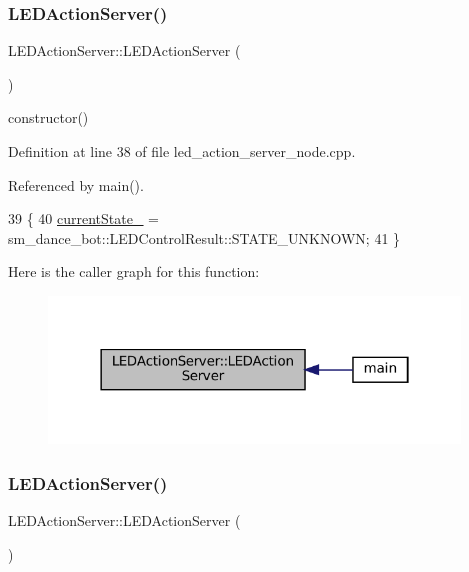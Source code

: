 \subsubsection{\texorpdfstring{L\+E\+D\+Action\+Server()}{LEDActionServer()}\hspace{0.1cm}{\footnotesize\ttfamily [1/5]}}
{\footnotesize\ttfamily L\+E\+D\+Action\+Server\+::\+L\+E\+D\+Action\+Server (\begin{DoxyParamCaption}{ }\end{DoxyParamCaption})\hspace{0.3cm}{\ttfamily [inline]}}

constructor() 

Definition at line 38 of file led\+\_\+action\+\_\+server\+\_\+node.\+cpp.



Referenced by main().


\begin{DoxyCode}
39   \{
40     \hyperlink{classLEDActionServer_a1dc456e987dc331501ad6ff2215661ff}{currentState\_} =  sm\_dance\_bot::LEDControlResult::STATE\_UNKNOWN;
41   \}
\end{DoxyCode}
Here is the caller graph for this function\+:
\nopagebreak
\begin{figure}[H]
\begin{center}
\leavevmode
\includegraphics[width=310pt]{classLEDActionServer_a6978c43940438b9fd8bfcd6b443092d3_icgraph}
\end{center}
\end{figure}
\mbox{\label{classLEDActionServer_a6978c43940438b9fd8bfcd6b443092d3}} 
\subsubsection{\texorpdfstring{L\+E\+D\+Action\+Server()}{LEDActionServer()}\hspace{0.1cm}{\footnotesize\ttfamily [2/5]}}
{\footnotesize\ttfamily L\+E\+D\+Action\+Server\+::\+L\+E\+D\+Action\+Server (\begin{DoxyParamCaption}{ }\end{DoxyParamCaption})\hspace{0.3cm}{\ttfamily [inline]}}

